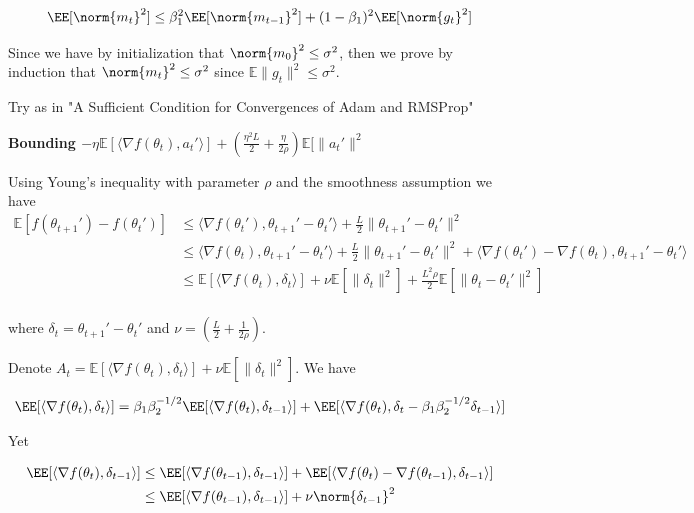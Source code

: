 \documentclass[11pt]{article}
\begin{document}
\begin{equation}
\EE[\norm{m_t}^2]  \leq \beta_1^2 \EE[\norm{m_{t-1}}^2] + (1 - \beta_1)^2 \EE[\norm{g_t}^2]
\end{equation}

Since we have by initialization that $\norm{m_0}^2 \leq \sigma^2$, then we prove by induction that $\norm{m_t}^2 \leq \sigma^2$ since $\mathbb E\|g_t\|^2\leq \sigma^2$.




\clearpage 

Try as in "A Sufficient Condition for Convergences of Adam and RMSProp"


\textbf{Bounding $-\eta\mathbb E[\langle \nabla f(\theta_t), a_t'\rangle]+\left(\frac{\eta^2L}{2} + \frac{\eta}{2\rho}\right) \mathbb E[\|a_t'\|^2$} 


Using Young's inequality with parameter $\rho$ and the smoothness assumption we have 
\begin{align*}
    \mathbb E[f(\theta_{t+1}')-f(\theta_t')] & \leq \langle \nabla f(\theta_t'), \theta_{t+1}'-\theta_t'\rangle+\frac{L}{2}\| \theta_{t+1}'-\theta_t'\|^2\\
    & \leq \langle \nabla f(\theta_t), \theta_{t+1}'-\theta_t'\rangle+\frac{L}{2}\| \theta_{t+1}'-\theta_t'\|^2 +  \langle \nabla f(\theta_t') - \nabla f(\theta_t), \theta_{t+1}'-\theta_t'\rangle \\
            &\leq \mathbb E[\langle \nabla f(\theta_t), \delta_t\rangle]+ \nu \mathbb E[\|\delta_t\|^2]+\frac{ L^2\rho}{2} \mathbb E[ \|\theta_t - \theta_t'\|^2]\\
\end{align*}

where $\delta_t = \theta_{t+1}'-\theta_t'$ and $\nu = \left(\frac{L}{2} + \frac{1}{2\rho}\right)$. 

Denote $A_t =  \mathbb E[\langle \nabla f(\theta_t), \delta_t\rangle]+ \nu \mathbb E[\|\delta_t\|^2] $.
We have

\begin{align*}
\EE[\langle \nabla f(\theta_t), \delta_t\rangle] = \beta_1\beta_2^{-1/2} \EE[\langle \nabla f(\theta_t), \delta_{t-1}\rangle] + \EE[\langle \nabla f(\theta_t), \delta_t - \beta_1\beta_2^{-1/2} \delta_{t-1} \rangle]
\end{align*}

Yet

\begin{align*}
\EE[\langle \nabla f(\theta_t), \delta_{t-1}\rangle]  &\leq \EE[\langle \nabla f(\theta_{t-1}), \delta_{t-1}\rangle] + \EE[\langle \nabla f(\theta_t) - \nabla f(\theta_{t-1}), \delta_{t-1}\rangle]\\
& \leq \EE[\langle \nabla f(\theta_{t-1}), \delta_{t-1}\rangle] + \nu \norm{\delta_{t-1}}^2 
\end{align*}
\end{document}
